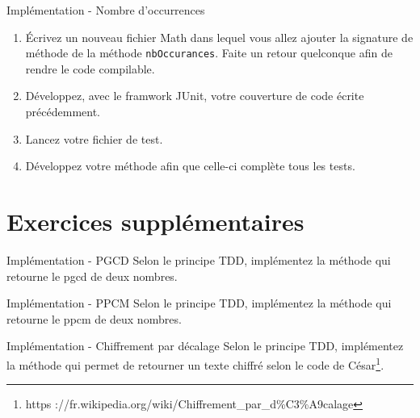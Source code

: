 \documentclass[a4paper,11pt]{article}
\begin{document}
	\begin{Exercice}{Implémentation - Nombre d’occurrences}
		\begin{enumerate}
			\item Écrivez un nouveau fichier Math dans lequel vous allez ajouter la signature de méthode de la méthode \texttt{nbOccurances}. Faite un retour quelconque afin de rendre le code compilable.
			\item Développez, avec le framwork JUnit, votre couverture de code écrite précédemment.
			\item Lancez votre fichier de test.
			\item Développez votre méthode afin que celle-ci complète tous les tests.
		\end{enumerate}
		
	\end{Exercice}




\section{Exercices supplémentaires}
	\begin{Exercice}{Implémentation - PGCD}
		Selon le principe TDD, implémentez la méthode  qui retourne le pgcd de deux nombres.
	\end{Exercice}

	\begin{Exercice}{Implémentation - PPCM}
		Selon le principe TDD, implémentez la méthode  qui retourne le ppcm de deux nombres.
	\end{Exercice}

	\begin{Exercice}{Implémentation - Chiffrement par décalage}
		Selon le principe TDD, implémentez la méthode  qui permet de retourner un texte chiffré selon le code de César\footnote{https ://fr.wikipedia.org/wiki/Chiffrement\_par\_d\%C3\%A9calage}.
		
	\end{Exercice}
\end{document}
